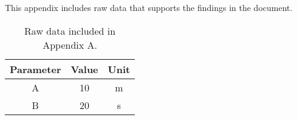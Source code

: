 This appendix includes raw data that supports the findings in the document.

\begin{table}[H]
    \centering
    \begin{tabular}{|c|c|c|}
        \hline
        Parameter & Value & Unit \\ \hline
        A         & 10    & m    \\ \hline
        B         & 20    & s    \\ \hline
    \end{tabular}
    \caption{Raw data included in Appendix A.}
    \label{tab:appendix_a}
\end{table}

